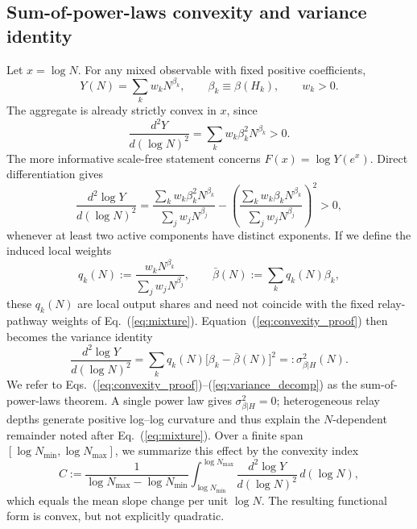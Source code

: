 \subsection{Sum-of-power-laws convexity and variance identity}\label{subsec:sum_power_laws}
Let \(x=\log N\). For any mixed observable with fixed positive coefficients,
\[
Y(N)=\sum_{k} w_k N^{\beta_k}, \qquad \beta_k\equiv \beta(H_k), \qquad w_k>0.
\]
The aggregate is already strictly convex in \(x\), since
\[
\frac{d^2 Y}{d(\log N)^2}=\sum_k w_k \beta_k^2 N^{\beta_k}>0.
\]
The more informative scale-free statement concerns \(F(x)=\log Y(e^x)\). Direct differentiation gives
\begin{equation}
\frac{d^2 \log Y}{d(\log N)^2}=\frac{\sum_k w_k \beta_k^2 N^{\beta_k}}{\sum_j w_j N^{\beta_j}}-\left(\frac{\sum_k w_k \beta_k N^{\beta_k}}{\sum_j w_j N^{\beta_j}}\right)^2>0,
\label{eq:convexity_proof}
\end{equation}
whenever at least two active components have distinct exponents. If we define the induced local weights
\[
q_k(N):=\frac{w_k N^{\beta_k}}{\sum_j w_j N^{\beta_j}},\qquad\bar{\beta}(N):=\sum_k q_k(N)\beta_k,
\]
these \(q_k(N)\) are local output shares and need not coincide with the fixed relay-pathway weights of Eq.~(\ref{eq:mixture}). Equation~(\ref{eq:convexity_proof}) then becomes the variance identity
\begin{equation}
\frac{d^2 \log Y}{d(\log N)^2}=\sum_k q_k(N)\bigl[\beta_k-\bar{\beta}(N)\bigr]^2=: \sigma^2_{\beta|H}(N).
\label{eq:variance_decomp}
\end{equation}
We refer to Eqs.~(\ref{eq:convexity_proof})--(\ref{eq:variance_decomp}) as the sum-of-power-laws theorem. A single power law gives \(\sigma^2_{\beta|H}=0\); heterogeneous relay depths generate positive log--log curvature and thus explain the \(N\)-dependent remainder noted after Eq.~(\ref{eq:mixture}). Over a finite span \([\log N_{\min},\log N_{\max}]\), we summarize this effect by the convexity index
\[
C:=\frac{1}{\log N_{\max}-\log N_{\min}}\int_{\log N_{\min}}^{\log N_{\max}}\frac{d^2\log Y}{d(\log N)^2}\,d(\log N),
\]
which equals the mean slope change per unit \(\log N\). The resulting functional form is convex, but not explicitly quadratic.

